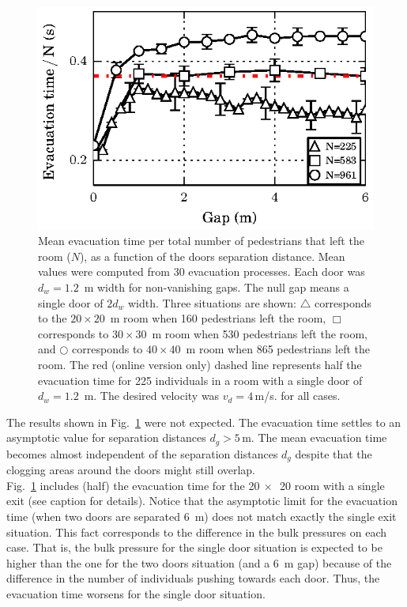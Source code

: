 \begin{figure}
\includegraphics[width=\columnwidth]{./fig9.eps}
\caption{\label{fig:1} Mean evacuation time per total number of pedestrians 
that left the room ($N$), as a function of the doors separation distance. Mean 
values were computed from 30 evacuation processes. Each door was $d_w=1.2$~m 
width for non-vanishing gaps. The null gap means a single door of $2d_w$ width. 
Three situations are shown: $\bigtriangleup$ corresponds to the $20\times20$~m 
room when 160 pedestrians left the room, $\Box$ corresponds to $30\times30$~m 
room when 530 pedestrians left the room, and $\bigcirc$ corresponds to 
$40\times40$~m room when  865 pedestrians left the room. The red (online version only) dashed line represents half the evacuation time for 225 individuals in a room with a single door of $d_w=1.2$~m. The desired velocity  was $v_d=4\,$m/s. for all cases.}
\end{figure}

The results shown in Fig.~\ref{fig:1} were not expected. The evacuation time 
settles to an asymptotic value for separation distances $d_g>5\,$m. The mean 
evacuation time becomes almost independent of the separation distances $d_g$ 
despite that the clogging areas around the doors might still overlap.  \\ 

Fig.~\ref{fig:1} includes (half) the  evacuation time for the 20$~\times$~20 room with a single exit (see caption for details). Notice that the asymptotic limit for the evacuation time (when two doors are separated 6~m) does not match exactly the single exit situation. This fact corresponds to the difference in the bulk pressures on each case. That is, the bulk pressure for the single door situation is expected to be higher than the one for the two doors situation (and a 6~m gap) because of the difference in the number of individuals pushing towards each door. Thus, the evacuation time worsens for the single door situation.\\

